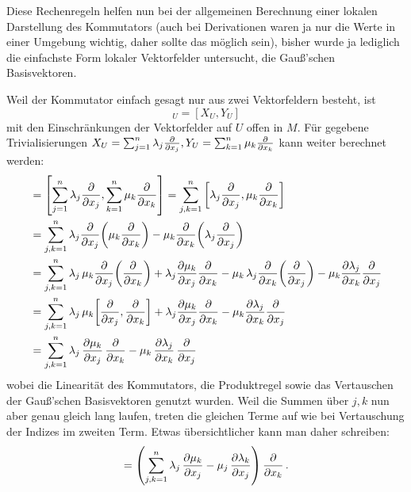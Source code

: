 \documentclass[../H_Analysis_main.tex]{subfiles}
\begin{document}
Diese Rechenregeln helfen nun bei der allgemeinen Berechnung einer lokalen Darstellung des Kommutators (auch bei Derivationen waren ja nur die Werte in einer Umgebung wichtig, daher sollte das möglich sein), bisher wurde ja lediglich die einfachste Form lokaler Vektorfelder untersucht, die Gauß'schen Basisvektoren.
\begin{bsp}
Weil der Kommutator einfach gesagt nur aus zwei Vektorfeldern besteht, ist
\begin{equation}
[X, Y]_U = [X_U, Y_U]
\end{equation}
mit den Einschränkungen der Vektorfelder auf $U$ offen in $M$. Für gegebene Trivialisierungen $X_U = \sum_{j = 1}^n \lambda_j \pdv{x_j}, Y_U = \sum_{k = 1}^n \mu_k \pdv{x_k} \displaystyle$ kann weiter berechnet werden:
\begin{align}
[X_U, Y_U] &= \qty[\sum_{j = 1}^n \lambda_j \pdv{x_j}, \sum_{k = 1}^n \mu_k \pdv{x_k}] = \sum_{j, k = 1}^n \qty[\lambda_j \pdv{x_j}, \mu_k \pdv{x_k}]
\notag\\
&= \sum_{j, k = 1}^n \lambda_j \pdv{x_j} \qty(\mu_k \pdv{x_k}) - \mu_k \pdv{x_k} \qty(\lambda_j \pdv{x_j}) 
\notag\\
&= \sum_{j, k = 1}^n \lambda_j \, \mu_k \pdv{x_j} \qty(\pdv{x_k}) + \lambda_j \pdv{\mu_k}{x_j} \pdv{x_k}  - \mu_k \, \lambda_j \pdv{x_k} \qty(\pdv{x_j}) - \mu_k \pdv{\lambda_j}{x_k} \pdv{x_j}
\notag\\
&= \sum_{j, k = 1}^n \lambda_j \, \mu_k \qty[\pdv{x_j}, \pdv{x_k}] + \lambda_j \pdv{\mu_k}{x_j} \pdv{x_k} - \mu_k \pdv{\lambda_j}{x_k} \pdv{x_j}
\notag\\
&= \sum_{j, k = 1}^n \lambda_j \, \pdv{\mu_k}{x_j} \, \pdv{x_k} - \mu_k \, \pdv{\lambda_j}{x_k} \, \pdv{x_j}\notag
\end{align}
wobei die Linearität des Kommutators, die Produktregel sowie das Vertauschen der Gauß'schen Basisvektoren genutzt wurden. Weil die Summen über $j, k$ nun aber genau gleich lang laufen, treten die gleichen Terme auf wie bei Vertauschung der Indizes im zweiten Term. Etwas übersichtlicher kann man daher schreiben:
\begin{equation}
[X_U, Y_U] = \qty(\sum_{j, k = 1}^n \lambda_j \, \pdv{\mu_k}{x_j} - \mu_j \, \pdv{\lambda_k}{x_j}) \, \pdv{x_k} \, .
\end{equation}
\end{bsp}
\end{document}
